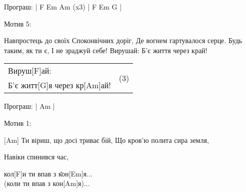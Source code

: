 \begin{guitar}
\begin{flushleft}
Програш: | F Em Am (x3) | F Em G |

Мотив 5:

Навпростець до своїх
Споконвічних доріг,
Де вогнем гартувалося серце.
Будь таким, як ти є,
І не зраджуй себе!
Вирушай:
Б'є життя через край!
\begin{tabular}{ @{}l | l }
    Вируш[F]ай: & \multirow{2}{*}{ (3) } \\
Б'є житт[G]я через кр[Am]ай!
\end{tabular}

Програш: | Am |

Мотив 1:

[Am] Ти віриш, що досі триває бій,
Що кров'ю полита сира земля,

Навіки спинився час,
\begin{tabbing}
кол[F]и ти впав з \=кон[Em]я... \\
                 \>(коли ти впав з кон[Am]я)...\\
\end{tabbing}
\end{flushleft}
\end{guitar}
